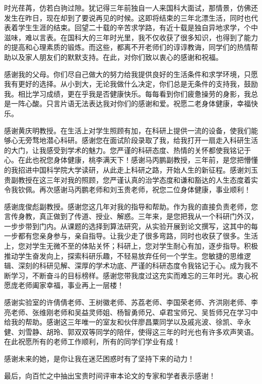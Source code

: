 时光荏苒，仿若白驹过隙。犹记得三年前独自一人来国科大面试，那情景，仿佛还发生在昨日，现在却到了要说再见的时候。这即将结束的三年北漂生活，同时也代表着学生生涯的结束。回望二十载的辛苦求学路，有近十载是独自异地求学，个中滋味，难以言表。在国科大的三年时光里，我不仅收获了很多知识，也得到了能力的提高和心理素质的锻炼。而这些，都离不开老师们的谆谆教诲，同学们的热情帮助以及家人朋友们的默默支持。在此，对你们致以衷心的感谢和祝福。

感谢我的父母。你们尽自己做大的努力给我提供良好的生活条件和求学环境，只愿我有更好的选择。从小到大，无论我做什么决定，你们总是无条件的支持我，鼓励我。相比学习成绩，更在乎我是否健康快乐。每每看到你们疲惫操劳的身影，我总是一阵心酸。只言片语无法表达我对你们的感谢和爱。祝愿二老身体健康，幸福快乐。

感谢黄庆明教授。在生活上对学生照顾有加，在科研上提供一流的设备，使我们能够心无旁骛地潜心科研。感谢您在面试阶段录取了我，给我打开一扇走入科研生活的大门，让我感受到学术的魅力。您严谨的科研态度、热情的关怀都使我铭记于心。在此也祝您身体健康，桃李满天下！感谢马丙鹏副教授，三年前，是您把懵懂的我招进中国科学院大学读研，从此走上科研之路，开始人生的新征程。感谢刘玉贵副教授在这三年对我的照顾，您严谨认真的治学态度和谦和豁达的人生态度着实令我钦佩。再次感谢马丙鹏老师和刘玉贵老师，祝您二位身体健康，事业顺利！

感谢庞俊彪副教授。感谢您这几年对我的指导和帮助。作为我的直接负责老师，您言传身教，真正做到了传道、授业、解惑。三年来，是您把我从一个科研门外汉，一步步带到门内。从课题的选择到算法研究，从实验开展到论文撰写，这其中的每一步都有您亲身参与，亲自指导。让我少走了很多弯路，同时也收获了很多。生活上，您对学生无微不至的体贴关怀；科研上，您对学生耐心有加，逐步指导。积极推动学生奋发向上，探索科研乐趣，不轻易放弃任何一个学生。您敏捷的思维逻辑、深刻的科研见解、深厚的学术功底、严谨的科研态度令我铭记于心。成为我不断学习，不断奋斗的目标榜样。感谢您带我度过这充实而难忘的三年时光。衷心祝愿庞老师阖家幸福，事业再上一层楼！

感谢实验室的许倩倩老师、王树徽老师、苏荔老师、李国荣老师、齐洪刚老师、李亮老师、张维刚老师和吴益灵师姐、杨智勇师兄、卓君宝师兄、吴哲师兄在学习中给我的帮助。感谢这三年唯一的室友和伙伴廖昌粟同学以及戚兆波、徐凯、辛永健、刘雪静、胡玲、郭双双等同学的陪伴，使得这三年的时光也有许多欢声笑语。在此祝愿所有的老师工作顺利，所有的同学们学业有成！

感谢未来的她，是你让我在迷茫困惑时有了坚持下来的动力！

最后，向百忙之中抽出宝贵时间评审本论文的专家和学者表示感谢！




\cleardoublepage[plain]%

